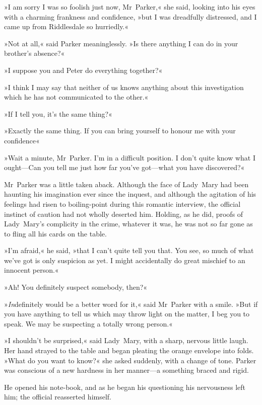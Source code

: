 »I am sorry I was so foolish just now, Mr~Parker,« she said, looking into his eyes with a charming frankness and confidence, »but I was dreadfully distressed, and I came up from Riddlesdale so hurriedly.«

»Not at all,« said Parker meaninglessly. »Is there anything I can do in your brother's absence?«

»I suppose you and Peter do everything together?«

»I think I may say that neither of us knows anything about this investigation which he has not communicated to the other.«

»If I tell you, it's the same thing?«

»Exactly the same thing. If you can bring yourself to honour me with your confidence\longdash«

»Wait a minute, Mr~Parker. I'm in a difficult position. I don't quite know what I ought—Can you tell me just how far you've got—what you have discovered?«

Mr~Parker was a little taken aback. Although the face of Lady~Mary had been haunting his imagination ever since the inquest, and although the agitation of his feelings had risen to boiling-point during this romantic interview, the official instinct of caution had not wholly deserted him. Holding, as he did, proofs of Lady~Mary's complicity in the crime, whatever it was, he was not so far gone as to fling all his cards on the table.

»I'm afraid,« he said, »that I can't quite tell you that. You see, so much of what we've got is only suspicion as yet. I might accidentally do great mischief to an innocent person.«

»Ah! You definitely suspect somebody, then?«

»\textit{In}definitely would be a better word for it,« said Mr~Parker with a smile. »But if you have anything to tell us which may throw light on the matter, I beg you to speak. We may be suspecting a totally wrong person.«

»I shouldn't be surprised,« said Lady~Mary, with a sharp, nervous little laugh. Her hand strayed to the table and began pleating the orange envelope into folds. »What do you want to know?« she asked suddenly, with a change of tone. Parker was conscious of a new hardness in her manner—a something braced and rigid.

He opened his note-book, and as he began his questioning his nervousness left him; the official reasserted himself.

